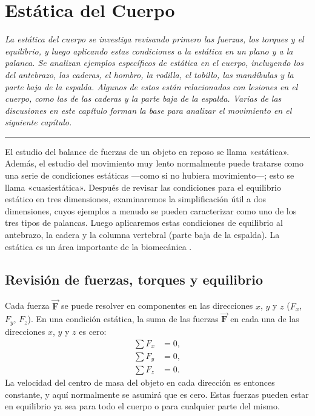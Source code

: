 \documentclass[12pt]{book}
\begin{document}
\setcounter{chapter}{1}

\chapter{Estática del Cuerpo}

\begin{flushleft}
    \textit{La estática del cuerpo se investiga revisando primero las fuerzas, los torques y el equilibrio, y luego aplicando estas condiciones a la estática en un plano y a la palanca. Se analizan ejemplos específicos de estática en el cuerpo, incluyendo los del antebrazo, las caderas, el hombro, la rodilla, el tobillo, las mandíbulas y la parte baja de la espalda. Algunos de estos están relacionados con lesiones en el cuerpo, como las de las caderas y la parte baja de la espalda. Varias de las discusiones en este capítulo forman la base para analizar el movimiento en el siguiente capítulo.}
\end{flushleft}

\hrule
\vspace{1em}

El estudio del balance de fuerzas de un objeto en reposo se llama «estática». Además, el estudio del movimiento muy lento normalmente puede tratarse como una serie de condiciones estáticas ---como si no hubiera movimiento---; esto se llama «cuasiestática». Después de revisar las condiciones para el equilibrio estático en tres dimensiones, examinaremos la simplificación útil a dos dimensiones, cuyos ejemplos a menudo se pueden caracterizar como uno de los tres tipos de palancas. Luego aplicaremos estas condiciones de equilibrio al antebrazo, la cadera y la columna vertebral (parte baja de la espalda). La estática es un área importante de la biomecánica \cite{15, 24, 28, 38}.

\section{Revisión de fuerzas, torques y equilibrio}

Cada fuerza $\vec{\mathbf{F}}$ se puede resolver en componentes en las direcciones $x$, $y$ y $z$ ($F_x$, $F_y$, $F_z$). En una condición estática, la suma de las fuerzas $\vec{\mathbf{F}}$ en cada una de las direcciones $x$, $y$ y $z$ es cero:
\begin{align}
\sum F_x &= 0, \nonumber \\
\sum F_y &= 0, \nonumber \\
\sum F_z &= 0.
\label{eq:2.1}
\end{align}
La velocidad del centro de masa del objeto en cada dirección es entonces constante, y aquí normalmente se asumirá que es cero. Estas fuerzas pueden estar en equilibrio ya sea para todo el cuerpo o para cualquier parte del mismo.
\end{document}
